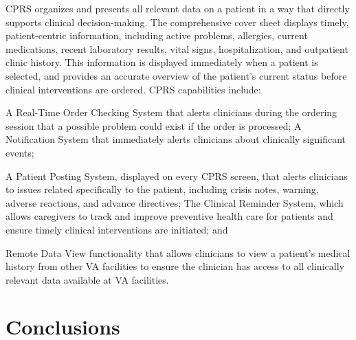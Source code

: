 \documentclass{OSEHRAArticle}
\begin{document}
CPRS organizes and presents all relevant data on a patient in a way that
directly supports clinical decision-making. The comprehensive cover sheet
displays timely, patient-centric information, including active problems,
allergies, current medications, recent laboratory results, vital signs,
hospitalization, and outpatient clinic history. This information is displayed
immediately when a patient is selected, and provides an accurate overview of
the patient’s current status before clinical interventions are ordered. CPRS
capabilities include:

A Real-Time Order Checking System that alerts clinicians during the ordering
session that a possible problem could exist if the order is processed; A
Notification System that immediately alerts clinicians about clinically
significant events;

A Patient Posting System, displayed on every CPRS screen, that alerts
clinicians to issues related specifically to the patient, including crisis
notes, warning, adverse reactions, and advance directives; The Clinical
Reminder System, which allows caregivers to track and improve preventive health
care for patients and ensure timely clinical interventions are initiated; and


Remote Data View functionality that allows clinicians to view a patient’s
medical history from other VA facilities to ensure the clinician has access to
all clinically relevant data available at VA facilities.

\section{Conclusions}



%
%



\end{document}
